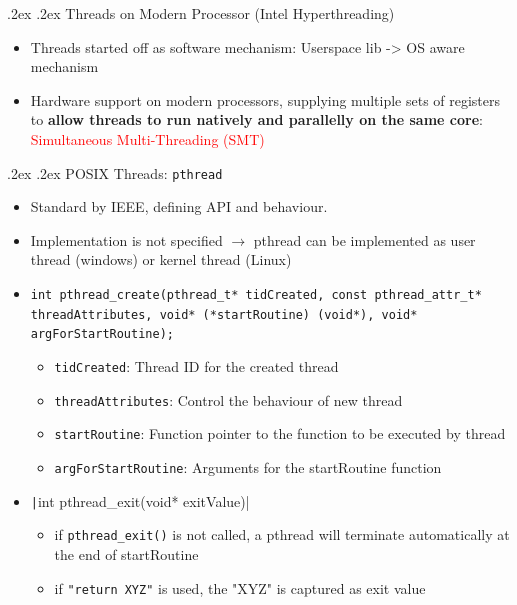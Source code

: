 \documentclass[13pt,landscape,a4paper]{article}
\makeatletter
\renewcommand{\subsection}{\@startsection{subsection}{1}{0mm}%
    {.2ex}%
    {.2ex}%
    {\sffamily\bfseries}}
\makeatother
\begin{document}
\begin{multicols*}{3}
        \subsection{Threads on Modern Processor (Intel Hyperthreading)}
        \begin{itemize}
            \item Threads started off as software mechanism: Userspace lib -> OS aware mechanism
            \item Hardware support on modern processors, supplying multiple sets of registers to \textbf{allow threads to run natively and parallelly on the same core}: \textcolor{red}{Simultaneous Multi-Threading (SMT)}
        \end{itemize}
        \subsection{POSIX Threads: \texttt{pthread}}
        \begin{itemize}
            \item Standard by IEEE, defining API and behaviour.
            \item Implementation is not specified $\rightarrow$ pthread can be implemented as user thread (windows) or kernel thread (Linux)
            \item \texttt{int pthread_create(pthread_t* tidCreated, const pthread_attr_t* threadAttributes, void* (*startRoutine) (void*), void* argForStartRoutine);}
            \begin{itemize}
                \item \texttt{tidCreated}: Thread ID for the created thread
                \item \texttt{threadAttributes}: Control the behaviour of new thread
                \item \texttt{startRoutine}: Function pointer to the function to be executed by thread
                \item \texttt{argForStartRoutine}: Arguments for the startRoutine function
            \end{itemize}
            \item \texttt|int pthread_exit(void* exitValue)|
            \begin{itemize}
                \item if \texttt{pthread\_exit()} is not called, a pthread will terminate automatically at the end of startRoutine
                \item if \texttt{"return XYZ"} is used, the "XYZ" is captured as exit value

\end{itemize}
\end{itemize}
\end{multicols*}
\end{document}
